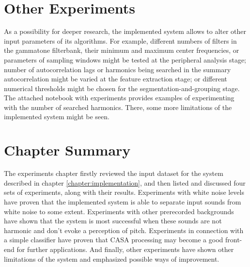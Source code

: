 \section{Other Experiments}

As a possibility for deeper research, the implemented system allows to alter other input parameters of its algorithms. For example, different numbers of filters in the gammatone filterbank, their minimum and maximum center frequencies, or parameters of sampling windows might be tested at the peripheral analysis stage; number of autocorrelation lags or harmonics being searched in the summary autocorrelation might be varied at the feature extraction stage; or different numerical thresholds might be chosen for the segmentation-and-grouping stage. The attached notebook with experiments provides examples of experimenting with the number of searched harmonics. There, some more limitations of the implemented system might be seen.

\section{Chapter Summary}

The experiments chapter firstly reviewed the input dataset for the system described in chapter \ref{chapter:implementation}, and then listed and discussed four sets of experiments, along with their results. Experiments with white noise levels have proven that the implemented system is able to separate input sounds from white noise to some extent. Experiments with other prerecorded backgrounds have shown that the system is most successful when these sounds are not harmonic and don't evoke a perception of pitch. Experiments in connection with a simple classifier have proven that CASA processing may become a good front-end for further applications. And finally, other experiments have shown other limitations of the system and emphasized possible ways of improvement.
